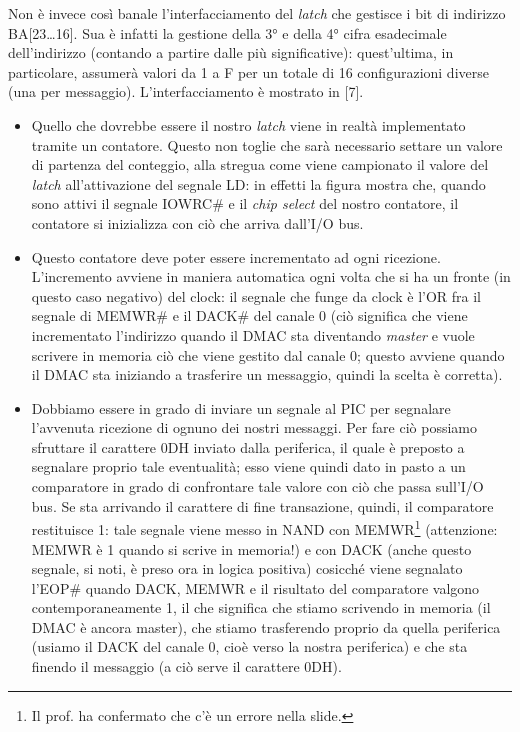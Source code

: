 Non è invece così banale l'interfacciamento del \textit{latch} che gestisce i bit di indirizzo BA[23\ldots 16]. Sua è infatti la gestione della 3° e della 4° cifra esadecimale dell'indirizzo (contando a partire dalle più significative): quest'ultima, in particolare, assumerà valori da 1 a F per un totale di 16 configurazioni diverse (una per messaggio).
L'interfacciamento è mostrato in [7]. 
\begin{itemize}
\item Quello che dovrebbe essere il nostro \textit{latch} viene in realtà implementato tramite un contatore. Questo non toglie che sarà necessario settare un valore di partenza del conteggio, alla stregua come viene campionato il valore del \textit{latch} all'attivazione del segnale LD: in effetti la figura mostra che, quando sono attivi il segnale IOWRC\# e il \textit{chip select} del nostro contatore, il contatore si inizializza con ciò che arriva dall'I/O bus. 
\item Questo contatore deve poter essere incrementato ad ogni ricezione. L'incremento avviene in maniera automatica ogni volta che si ha un fronte (in questo caso negativo) del clock: il segnale che funge da clock è l'OR fra il segnale di MEMWR\# e il DACK\# del canale 0 (ciò significa che viene incrementato l'indirizzo quando il DMAC sta diventando \textit{master} e vuole scrivere in memoria ciò che viene gestito dal canale 0; questo avviene quando il DMAC sta iniziando a trasferire un messaggio, quindi la scelta è corretta).
\item Dobbiamo essere in grado di inviare un segnale al PIC per segnalare l'avvenuta ricezione di ognuno dei nostri messaggi. Per fare ciò possiamo sfruttare il carattere 0DH inviato dalla periferica, il quale è preposto a segnalare proprio tale eventualità; esso viene quindi dato in pasto a un comparatore in grado di confrontare tale valore con ciò che passa sull'I/O bus. Se sta arrivando il carattere di fine transazione, quindi, il comparatore restituisce 1: tale segnale viene messo in NAND con MEMWR\footnote{Il prof. ha confermato che c'è un errore nella slide.} (attenzione: MEMWR è 1 quando si scrive in memoria!) e con DACK (anche questo segnale, si noti, è preso ora in logica positiva) cosicché viene segnalato l'EOP\# quando DACK, MEMWR e il risultato del comparatore valgono contemporaneamente 1, il che significa che stiamo scrivendo in memoria (il DMAC è ancora master), che stiamo trasferendo proprio da quella periferica (usiamo il DACK del canale 0, cioè verso la nostra periferica) e che sta finendo il messaggio (a ciò serve il carattere 0DH).

\end{itemize}
